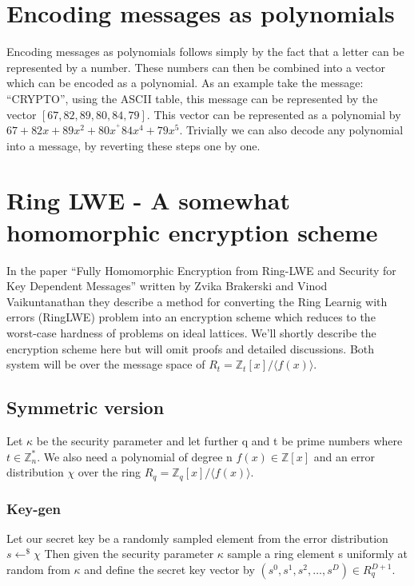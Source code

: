 \documentclass[../main.tex]{subfiles}
\begin{document}
    \section{Encoding messages as polynomials} \label{sec:encoding-messages-as-polynomials}
    Encoding messages as polynomials follows simply by the fact that a letter can be represented by a number.
    These numbers can then be combined into a vector which can be encoded as a polynomial.
    As an example take the message: ``CRYPTO'', using the ASCII table, this message can be represented by the
    vector $[67, 82, 89, 80, 84, 79]$.
    This vector can be represented as a polynomial by $67 + 82x + 89x^2 + 80x^^ + 84x^4 + 79x^5$.
    Trivially we can also decode any polynomial into a message, by reverting these steps one by one.

    \section{Ring LWE - A somewhat homomorphic encryption scheme}
    In the paper ``Fully Homomorphic Encryption from Ring-LWE and Security for Key Dependent Messages'' written by
    Zvika Brakerski and Vinod Vaikuntanathan \cite{brakerski2011fully}
    they describe a method for converting the Ring Learnig with errors (RingLWE) problem into an encryption scheme
    which reduces to the worst-case hardness of problems on ideal lattices.
    We'll shortly describe the encryption scheme here but will omit proofs and detailed discussions.
    Both system will be over the message space of $R_t = \mathbb{Z}_t[x] / \langle f(x) \rangle $.

    \subsection{Symmetric version}
    Let $\kappa$ be the security parameter and let further q and t be prime numbers where $t \in \mathbb{Z}_n^*$.
    We also need a polynomial of degree n $f(x) \in \mathbb{Z}[x]$ and an error distribution $\chi$ over the ring
    $R_q = \mathbb{Z}_q[x] / \langle f(x) \rangle$.


    \subsubsection{Key-gen}
    Let our secret key be a randomly sampled element from the error distribution $s \leftarrow^\$ \chi$
    Then given the security parameter $\kappa$ sample a ring element s uniformly at random from $\kappa$ and define the
    secret key vector by $(s^0, s^1, s^2, \dots, s^D) \in R_q^{D+1}$.
\end{document}
